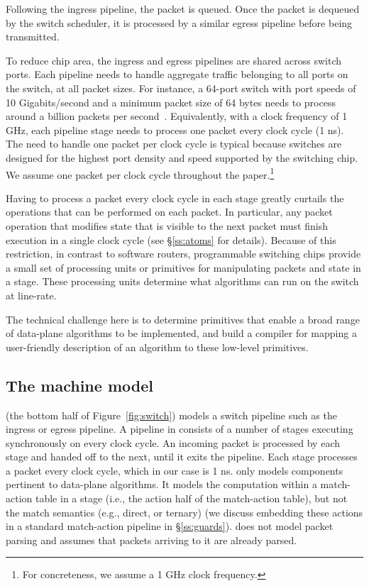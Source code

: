 Following the ingress pipeline, the packet is queued. Once the packet
is dequeued by the switch scheduler, it is processed by a similar
egress pipeline before being transmitted.

To reduce chip area, the ingress and egress pipelines are shared
across switch ports.  Each pipeline needs to handle aggregate traffic
belonging to all ports on the switch, at all packet sizes.  For
instance, a 64-port switch with port speeds of 10 Gigabits/second and
a minimum packet size of 64 bytes needs to process around a billion
packets per second~\cite{rmt}.  Equivalently, with a clock frequency
of 1 GHz, each pipeline stage needs to process one packet every clock
cycle (1 ns).  The need to handle one packet per clock cycle is
typical because switches are designed for the highest port density and
speed supported by the switching chip. We assume one packet per clock
cycle throughout the paper.\footnote{For concreteness, we assume a 1
  GHz clock frequency.}

Having to process a packet every clock cycle in each stage greatly
curtails the operations that can be performed on each packet. In
particular, any packet operation that modifies state that is visible
to the next packet must finish execution in a single clock cycle (see
\S\ref{ss:atoms} for details). Because of this restriction, in
contrast to software routers, programmable switching chips provide a
small set of processing units or primitives for manipulating packets
and state in a stage. These processing units determine what algorithms
can run on the switch at line-rate. 

The technical challenge here is to determine primitives that enable a
broad range of data-plane algorithms to be implemented, and build a
compiler for mapping a user-friendly description of an algorithm to
these low-level primitives.
\subsection{The \absmachine machine model}

\absmachine (the bottom half of Figure~\ref{fig:switch}) models a switch
pipeline such as the ingress or egress pipeline. A pipeline in \absmachine
consists of a number of stages executing synchronously on every clock cycle. An
incoming packet is processed by each stage and handed off to the next, until it
exits the pipeline. Each stage processes a packet every clock cycle, which in
our case is 1 ns. \absmachine only models components pertinent to data-plane
algorithms.  It models the computation within a match-action table in a stage
(i.e., the action half of the match-action table), but not the match semantics
(e.g., direct, or ternary) (we discuss embedding these actions in a standard
match-action pipeline in \S\ref{ss:guards}). \absmachine does not model packet
parsing and assumes that packets arriving to it are already parsed.

